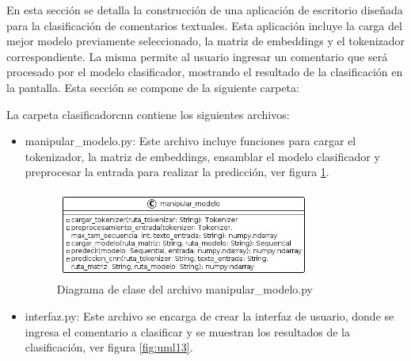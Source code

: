 En esta sección se detalla la construcción de una aplicación de escritorio diseñada para la clasificación de comentarios textuales. Esta aplicación incluye la carga del mejor modelo previamente seleccionado, la matriz de embeddings y el tokenizador correspondiente. La misma permite al usuario ingresar un comentario que será procesado por el modelo clasificador, mostrando el resultado de la clasificación en la pantalla. Esta sección se compone de la siguiente carpeta:

La carpeta clasificadorcnn contiene los siguientes archivos:

\begin{itemize}

\item manipular\_modelo.py: Este archivo incluye funciones para cargar el tokenizador, la matriz de embeddings, ensamblar el modelo clasificador y preprocesar la entrada para realizar la predicción, ver figura \ref{fig:uml12}.

\begin{figure}
	\includegraphics[width=0.8\textwidth]{capitulo5/figuras/fig12.png}
	\caption{Diagrama de clase del archivo manipular\_modelo.py}
	\label{fig:uml12}
\end{figure}

\item interfaz.py: Este archivo se encarga de crear la interfaz de usuario, donde se ingresa el comentario a clasificar y se muestran los resultados de la clasificación, ver figura \ref{fig:uml13}.


\end{itemize}
